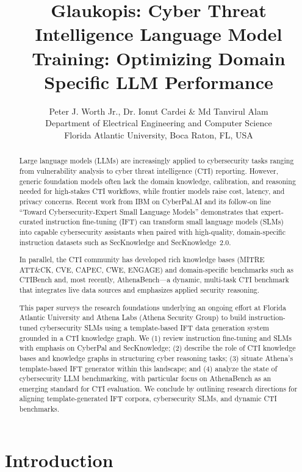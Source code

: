 \documentclass[10pt]{article}
\title{Glaukopis: Cyber Threat Intelligence Language Model Training: Optimizing Domain Specific LLM Performance}
\author{
  Peter J. Worth Jr., Dr. Ionut Cardei \& Md Tanvirul Alam\\
  Department of Electrical Engineering and Computer Science\\
  Florida Atlantic University, Boca Raton, FL, USA
}
\date{}
\begin{document}
\maketitle

\begin{abstract}
Large language models (LLMs) are increasingly applied to cybersecurity tasks ranging from vulnerability analysis to cyber threat intelligence (CTI) reporting. However, generic foundation models often lack the domain knowledge, calibration, and reasoning needed for high-stakes CTI workflows, while frontier models raise cost, latency, and privacy concerns. Recent work from IBM on CyberPal.AI and its follow-on line ``Toward Cybersecurity-Expert Small Language Models'' demonstrates that expert-curated instruction fine-tuning (IFT) can transform small language models (SLMs) into capable cybersecurity assistants when paired with high-quality, domain-specific instruction datasets such as SecKnowledge and SecKnowledge~2.0.\cite{levi2024cyberpal,levi2025toward}

In parallel, the CTI community has developed rich knowledge bases (MITRE ATT\&CK, CVE, CAPEC, CWE, ENGAGE) and domain-specific benchmarks such as CTIBench and, most recently, AthenaBench---a dynamic, multi-task CTI benchmark that integrates live data sources and emphasizes applied security reasoning.\cite{strom2018mitreattck,mitreCVE,mitreCWE,mitreCAPEC,alam2024ctibench,alam2025athenabench}

This paper surveys the research foundations underlying an ongoing effort at Florida Atlantic University and Athena Labs (Athena Security Group) to build instruction-tuned cybersecurity SLMs using a template-based IFT data generation system grounded in a CTI knowledge graph. We (1) review instruction fine-tuning and SLMs with emphasis on CyberPal and SecKnowledge; (2) describe the role of CTI knowledge bases and knowledge graphs in structuring cyber reasoning tasks; (3) situate Athena’s template-based IFT generator within this landscape; and (4) analyze the state of cybersecurity LLM benchmarking, with particular focus on AthenaBench as an emerging standard for CTI evaluation. We conclude by outlining research directions for aligning template-generated IFT corpora, cybersecurity SLMs, and dynamic CTI benchmarks.
\end{abstract}

\section{Introduction}
\end{document}
